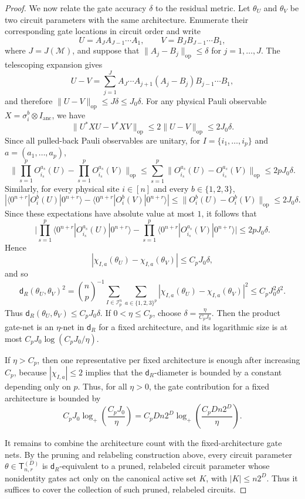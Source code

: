 \documentclass[12pt]{article}
\newcommand{\mcI}{\mathcal{I}}
\begin{document}
\begin{proof}
We now relate the gate accuracy \(\delta\) to the residual metric. Let \(\theta_U\) and \(\theta_V\) be two circuit parameters with the same
architecture. Enumerate their corresponding gate locations in circuit order and write
\[
    U=A_J A_{J-1}\cdots A_1,
    \qquad
    V=B_JB_{J-1}\cdots B_1,
\]
where \(J=J(\mathcal M)\), and suppose that $\|A_j-B_j\|_{\mathrm{op}}\le\delta$ for $j=1,\dots,J$. The telescoping expansion gives
\[
    U-V
    =
    \sum_{j=1}^J
    A_J\cdots A_{j+1}
    (A_j-B_j)
    B_{j-1}\cdots B_1,
\]
and therefore $\|U-V\|_{\mathrm{op}} \le J\delta \le J_0\delta$. For any physical Pauli observable \(X=\sigma_i^b\otimes I_{\mathrm{anc}}\), we have
\[
    \|U^*XU-V^*XV\|_{\mathrm{op}}
    \le
    2\|U-V\|_{\mathrm{op}}
    \le
    2J_0\delta.
\]
Since all pulled-back Pauli observables are unitary, for
\(I=\{i_1,\dots,i_p\}\) and \(a=(a_1,\dots,a_p)\),
\[
\big\|
\prod_{s=1}^p O_{i_s}^{a_s}(U)
-
\prod_{s=1}^p O_{i_s}^{a_s}(V)
\big\|_{\mathrm{op}}
\le
\sum_{s=1}^p
\|O_{i_s}^{a_s}(U)-O_{i_s}^{a_s}(V)\|_{\mathrm{op}}
\le
2pJ_0\delta.
\]
Similarly, for every physical site \(i\in[n]\) and every \(b\in\{1,2,3\}\),
\[
\left|
\langle 0^{n+r}|O_i^b(U)|0^{n+r}\rangle
-
\langle 0^{n+r}|O_i^b(V)|0^{n+r}\rangle
\right|
\le
\|O_i^b(U)-O_i^b(V)\|_{\mathrm{op}}
\le
2J_0\delta .
\]
Since these expectations have absolute value at most \(1\), it follows that
\[
\big|
\prod_{s=1}^p
\langle 0^{n+r}|O_{i_s}^{a_s}(U)|0^{n+r}\rangle
-
\prod_{s=1}^p
\langle 0^{n+r}|O_{i_s}^{a_s}(V)|0^{n+r}\rangle
\big|
\le
2pJ_0\delta .
\]
Hence
\[
    |\chi_{I,a}(\theta_U)-\chi_{I,a}(\theta_V)|
    \le C_pJ_0\delta,
\]
and so
\[
\mathsf d_R(\theta_U,\theta_V)^2
=
\binom np^{-1}
\sum_{I\in\mcI_p^n}
\sum_{a\in\{1,2,3\}^p}
|\chi_{I,a}(\theta_U)-\chi_{I,a}(\theta_V)|^2
\le C_pJ_0^2\delta^2.
\]
Thus $\mathsf{d}_{R}(\theta_U,\theta_V)\le C_pJ_0\delta$. If \(0<\eta\le C_p\), choose $\delta=\frac{\eta}{C_pJ_0}.$ Then the product gate-net is an \(\eta\)-net in \(\mathsf{d}_{R}\) for a
fixed architecture, and its logarithmic size is at most $C_pJ_0\log (C_pJ_0/\eta)$.

If \(\eta>C_p\), then one representative per fixed architecture is enough
after increasing \(C_p\), because \(|\chi_{I,a}|\le2\) implies that the
\(\mathsf{d}_{R}\)-diameter is bounded by a constant depending only on $p$.
Thus, for all \(\eta>0\), the gate contribution for a fixed architecture is
bounded by
\[
    C_pJ_0\log_+\left(\frac{C_pJ_0}{\eta}\right)
    =
    C_pDn2^D
    \log_+\left(\frac{C_pDn2^D}{\eta}\right).
\]

It remains to combine the architecture count with the fixed-architecture gate nets. By the pruning and relabeling construction above, every circuit parameter
\(\theta\in\mathsf{T}_{n,r}^{(D)}\) is \(\mathsf{d}_{R}\)-equivalent to a
pruned, relabeled circuit parameter whose nonidentity gates act only on the
canonical active set \(K\), with \(|K|\le n2^D\). Thus it suffices to cover the collection of such pruned, relabeled circuits.


\end{proof}
\end{document}
